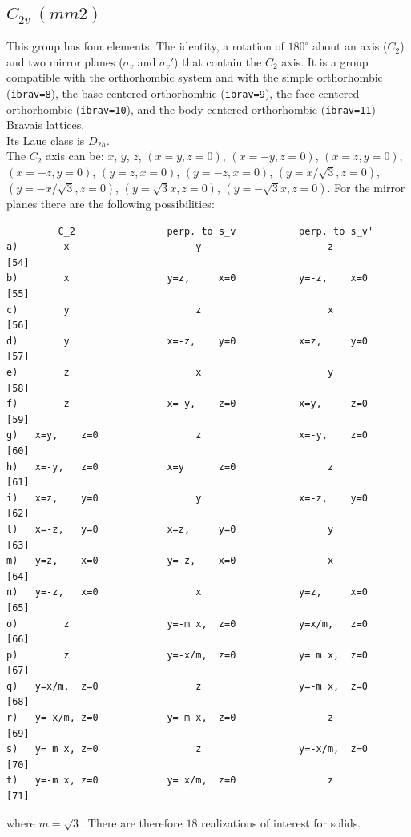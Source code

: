 \documentclass[12pt,a4paper]{article}
\begin{document}
\subsection{\color{web-blue}$C_{2v}\ (mm2)$} 
This group has four elements: The identity, a rotation of $180^\circ$ about
an axis ($C_2$) and two mirror planes ($\sigma_v$ and $\sigma_v'$) that contain 
the $C_2$ axis.
It is a group compatible with the orthorhombic system and with the
simple orthorhombic (\texttt{ibrav=8}), the base-centered
orthorhombic (\texttt{ibrav=9}), the face-centered orthorhombic 
(\texttt{ibrav=10}), and the body-centered orthorhombic (\texttt{ibrav=11}) 
Bravais lattices.\\
Its Laue class is $D_{2h}$. \\
The $C_2$ axis can be:
$x$, $y$, $z$, $(x=y, z=0)$, $(x=-y, z=0)$, $(x=z, y=0)$, $(x=-z, y=0)$,
$(y=z, x=0)$, $(y=-z, x=0)$, $(y=x/\sqrt{3}, z=0)$, $(y=-x/\sqrt{3}, z=0)$, 
$(y=\sqrt{3}x, z=0)$, $(y=-\sqrt{3}x, z=0)$. For the mirror planes there are
the following possibilities:
\begin{verbatim}
         C_2                perp. to s_v           perp. to s_v'
a)        x                      y                      z          [54]
b)        x                 y=z,     x=0           y=-z,    x=0    [55]
c)        y                      z                      x          [56]
d)        y                 x=-z,    y=0           x=z,     y=0    [57]
e)        z                      x                      y          [58]    
f)        z                 x=-y,    z=0           x=y,     z=0    [59]
g)   x=y,    z=0                 z                 x=-y,    z=0    [60]
h)   x=-y,   z=0            x=y      z=0                z          [61] 
i)   x=z,    y=0                 y                 x=-z,    y=0    [62] 
l)   x=-z,   y=0            x=z,     y=0                y          [63]
m)   y=z,    x=0            y=-z,    x=0                x          [64]
n)   y=-z,   x=0                 x                 y=z,     x=0    [65]
o)        z                 y=-m x,  z=0           y=x/m,   z=0    [66] 
p)        z                 y=-x/m,  z=0           y= m x,  z=0    [67] 
q)   y=x/m,  z=0                 z                 y=-m x,  z=0    [68]
r)   y=-x/m, z=0            y= m x,  z=0                z          [69]
s)   y= m x, z=0                 z                 y=-x/m,  z=0    [70]
t)   y=-m x, z=0            y= x/m,  z=0                z          [71]
\end{verbatim}
where $m=\sqrt{3}$.
There are therefore $18$ realizations of interest for solids. \\
\end{document}
